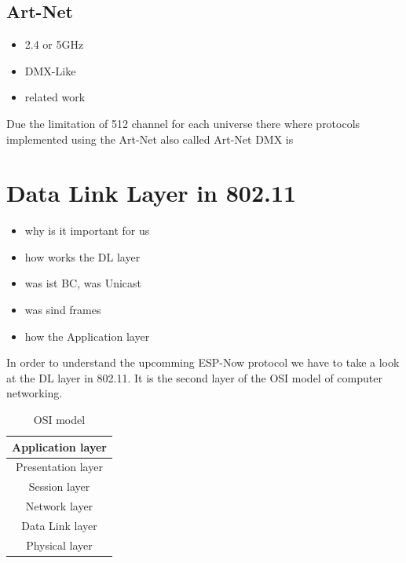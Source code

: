 \documentclass[]{ccs-thesis}
\begin{document}
\subsection*{Art-Net}
\label{sec:artnet}
\begin{itemize}
\item 2.4 or 5GHz
\item DMX-Like
\item related work
\end{itemize}

Due the limitation of 512 channel for each universe there where protocols implemented using the 
Art-Net also called Art-Net DMX is 

\section{Data Link Layer in 802.11}
\begin{itemize}
	\item why is it important for us
	\item how works the DL layer
	\item was ist BC, was Unicast
	\item was sind frames
	\item how the Application layer
\end{itemize}
In order to understand the upcomming ESP-Now protocol we have to take a look at the \ac{DL} layer in 802.11.
It is the second layer of the \ac{OSI} model of computer networking. 

\begin{table}
	\centering
	\begin{tabular}{ |c| } 
		\hline
		Application layer\\
		\hline
		Presentation layer\\
		\hline
		Session layer\\
		\hline
		Network layer\\
		\hline
		Data Link layer\\
		\hline
		Physical layer\\
		\hline
	\end{tabular}
	\caption{\ac{OSI} model}
	\label{tab:OsiModel}
\end{table}
\end{document}
